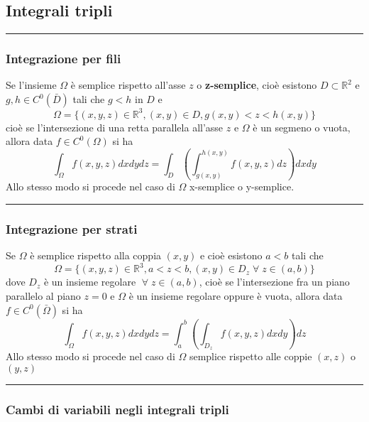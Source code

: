 \subsection{Integrali tripli}
\rule{\textwidth}{0,4pt}
\begin{tcolorbox}
\subsubsection{Integrazione per fili}
Se l'insieme $\Omega$ è semplice rispetto all'asse $z$ o \textbf{z-semplice}, cioè esistono $D \subset \mathbb{R}^2$ e $g,h \in C^0(\bar{D})$ tali che $g<h$ in $D$ e
\[
    \Omega = \{(x,y,z) \in \mathbb{R}^3, (x,y)\in D, g(x,y)<z<h(x,y)\}
\]
cioè se l'intersezione di una retta parallela all'asse $z$ e $\Omega$ è un segmeno o vuota, allora data $f \in C^0(\Omega)$ si ha
\[
    \int_\Omega f(x,y,z) dxdydz = \int_D\left(\int_{g(x,y)}^{h(x,y)}f(x,y,z) dz\right)dxdy
\] 
Allo stesso modo si procede nel caso di $\Omega$ x-semplice o y-semplice.\newline
\end{tcolorbox}
\rule{\textwidth}{0,4pt}
\begin{tcolorbox}
\subsubsection{Integrazione per strati}
Se $\Omega$ è semplice rispetto alla coppia $(x,y)$ e cioè esistono $a<b$ tali che
\[
    \Omega = \{(x,y,z) \in \mathbb{R}^3, a<z<b, (x,y) \in D_z \;\forall\;z \in(a,b)\}
\]
dove $D_z$ è un insieme regolare $\;\forall\;z \in(a,b)$, cioè se l'intersezione fra un piano parallelo al piano $z=0$ e $\Omega$ è un insieme regolare oppure è vuota, allora data $f \in C^0(\bar{\Omega})$ si ha 
\[
    \int_\Omega f(x,y,z) dxdydz = \int_{a}^{b}\left(\int_{D_z}f(x,y,z)dxdy\right)dz
\]
Allo stesso modo si procede nel caso di $\Omega$ semplice rispetto alle coppie $(x,z)$ o $(y,z)$\newline
\end{tcolorbox}
\rule{\textwidth}{0,4pt}
\subsubsection{Cambi di variabili negli integrali tripli}
